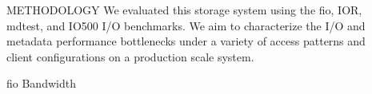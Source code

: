 \documentclass[final]{beamer}
\newlength{\sepwidth}
\newlength{\colwidth}
\newcommand{\separatorcolumn}{\begin{column}{\sepwidth}\end{column}}
\begin{document}
\begin{frame}[t, fragile]
\begin{columns}[t]
\begin{column}{\colwidth}
\end{column}

\separatorcolumn

\begin{column}{\colwidth}


  \begin{block}{METHODOLOGY}
    We evaluated this storage system using the fio, IOR, mdtest, and IO500 I/O benchmarks. 
    We aim to characterize the I/O and metadata performance bottlenecks under a 
    variety of access patterns and client configurations on a production scale system.
    
  \end{block}

  \begin{block}{fio Bandwidth}

    
    

\end{block}
\end{column}
\end{columns}
\end{frame}
\end{document}
